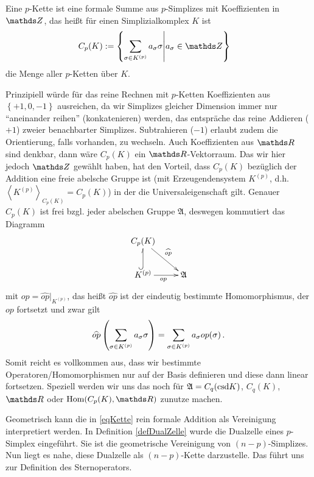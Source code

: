   \begin{definition}
    Eine \( p \)-Kette ist eine formale Summe aus \( p \)-Simplizes mit Koeffizienten in \( \Z \),
    das heißt für einen Simplizialkomplex \( K \) ist
    \begin{align}
      \label{eqKette}
      C_{p}(K) &:= \left\{\sum_{\sigma\in K^{(p)}}a_{\sigma}\sigma \middle| a_{\sigma}\in\Z \right\}
    \end{align}
    die Menge aller \( p \)-Ketten über \( K \).
  \end{definition}
  Prinzipiell würde für das reine Rechnen mit \( p \)-Ketten Koeffizienten aus \( \left\{ +1, 0,  -1 \right\} \) ausreichen,
  da wir Simplizes gleicher Dimension immer nur "`aneinander reihen"' (konkatenieren) werden, das entspräche das reine Addieren (\( +1 \)) zweier benachbarter Simplizes.
  Subtrahieren (\( -1 \)) erlaubt zudem die Orientierung, falls vorhanden, zu wechseln.
  Auch Koeffizienten aus \( \R \) sind denkbar, dann wäre \( C_{p}(K) \) ein \( \R \)-Vektorraum.
  Das wir hier jedoch \( \Z \) gewählt haben, hat den Vorteil, dass \( C_{p}(K) \) bezüglich der Addition eine freie abelsche Gruppe ist
  (mit Erzeugendensystem \( K^{(p)} \), d.h.  \( \left\langle K^{(p)} \right\rangle_{C_{p}(K)} = C_{p}(K) \))
  in der die Universaleigenschaft gilt.
  Genauer \( C_{p}(K) \) ist frei bzgl. jeder abelschen Gruppe \( \mathfrak{A} \), deswegen kommutiert das Diagramm
  \begin{align}
    \label{diagFreieAbelscheGruppe}
    \begin{xy}
      \xymatrix{
        C_{p}(K) \ar[rd]^{\widehat{op}} & \\
        K^{(p)} \ar@^{(->}[u] \ar[r]_{op}& \mathfrak{A}
      }
    \end{xy}
  \end{align}
  mit \( op = \widehat{op}|_{K^{(p)}} \), das heißt \( \widehat{op} \) ist der eindeutig bestimmte Homomorphismus, der \( op \) fortsetzt und zwar gilt
  \begin{align}
    \widehat{op}\left(\sum_{\sigma\in K^{(p)}}a_{\sigma}\sigma\right) = \sum_{\sigma\in K^{(p)}}a_{\sigma}op(\sigma) \,\text{.}
  \end{align}
  Somit reicht es vollkommen aus, dass wir bestimmte Operatoren/Homomorphismen nur auf der Basis definieren und diese dann linear fortsetzen.
  Speziell werden wir uns das noch für \( \mathfrak{A} = C_{q}(\text{csd} K) \), \( C_{q}(K) \), \( \R \) oder \( \hom(C_{p}(K),\R) \) zunutze machen. 

  Geometrisch kann die in \eqref{eqKette} rein formale Addition als Vereinigung interpretiert werden. 
  In Definition \ref{defDualZelle} wurde die Dualzelle eines \( p \)-Simplex eingeführt. 
  Sie ist die geometrische Vereinigung von \( (n-p) \)-Simplizes.
  Nun liegt es nahe, diese Dualzelle als \( (n-p) \)-Kette darzustelle.
  Das führt uns zur Definition des Sternoperators.

